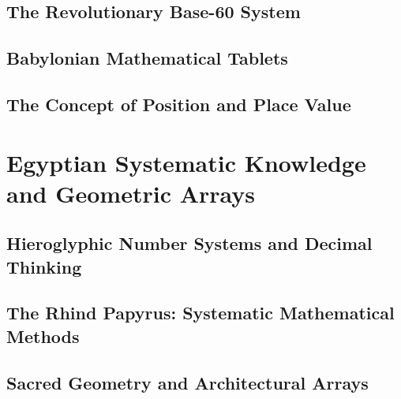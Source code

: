 \documentclass[12pt, oneside, openany]{book}
\begin{document}
\section{The Revolutionary Base-60 System}

\section{Babylonian Mathematical Tablets}

\section{The Concept of Position and Place Value}


\chapter{Egyptian Systematic Knowledge and Geometric Arrays}

\section{Hieroglyphic Number Systems and Decimal Thinking}

\section{The Rhind Papyrus: Systematic Mathematical Methods}

\section{Sacred Geometry and Architectural Arrays}
\end{document}
